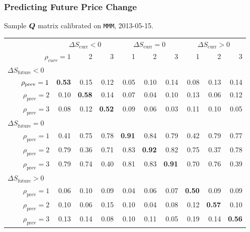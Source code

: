 \begin{frame}
\frametitle{Predicting Future Price Change}
Sample $\boldsymbol{Q}$ matrix calibrated on \texttt{MMM}, 2013-05-15.
\begin{table}%
%
\begin{adjustbox}{width=\textwidth}
\begin{tabular}{@{} r@{\hskip 1cm} *{9}{r} @{}}%
\toprule
& \multicolumn{3}{c}{$\Delta S_\text{curr} < 0$} & \multicolumn{3}{c}{$\Delta S_\text{curr} = 0$} & \multicolumn{3}{c}{$\Delta S_\text{curr} > 0$} \\
\cmidrule(lr){2-4} \cmidrule(lr){5-7} \cmidrule(lr){8-10}
\multicolumn{2}{r}{$\rho_{curr} = 1$} & 2 & 3 & 1 & 2 & 3 & 1 & 2 & 3 \\
\midrule
\multicolumn{10}{l}{$\Delta S_\text{future} < 0$} \\
$\hphantom{abcd}\rho_\text{prev} = 1$ & \bf 0.53 & 0.15 & 0.12 & 0.05 & 0.10 & 0.14 & 0.08 & 0.13 & 0.14 \\
$\rho_\text{prev} = 2$ & 0.10 & \bf 0.58 & 0.14 & 0.07 & 0.04 & 0.10 & 0.13 & 0.06 & 0.12 \\
$\rho_\text{prev} = 3$ & 0.08 & 0.12 & \bf 0.52 & 0.09 & 0.06 & 0.03 & 0.11 & 0.10 & 0.05 \\[0.6ex]
\multicolumn{10}{l}{$\Delta S_\text{future} = 0$} \\
$\rho_\text{prev} = 1$ & 0.41 & 0.75 & 0.78 & \bf 0.91 & 0.84 & 0.79 & 0.42 & 0.79 & 0.77 \\
$\rho_\text{prev} = 2$ & 0.79 & 0.36 & 0.71 & 0.83 & \bf 0.92 & 0.82 & 0.75 & 0.37 & 0.78 \\
$\rho_\text{prev} = 3$ & 0.79 & 0.74 & 0.40 & 0.81 & 0.83 & \bf 0.91 & 0.70 & 0.76 & 0.39 \\[0.6ex]
\multicolumn{10}{l}{$\Delta S_\text{future} > 0$} \\
$\rho_\text{prev} = 1$ & 0.06 & 0.10 & 0.09 & 0.04 & 0.06 & 0.07 & \bf 0.50 & 0.09 & 0.09 \\
$\rho_\text{prev} = 2$ & 0.10 & 0.06 & 0.15 & 0.10 & 0.04 & 0.08 & 0.12 & \bf 0.57 & 0.10 \\
$\rho_\text{prev} = 3$ & 0.13 & 0.14 & 0.08 & 0.10 & 0.11 & 0.05 & 0.19 & 0.14 & \bf 0.56 \\
\bottomrule
\end{tabular}%
\end{adjustbox}%
\end{table}%
\end{frame}
%
